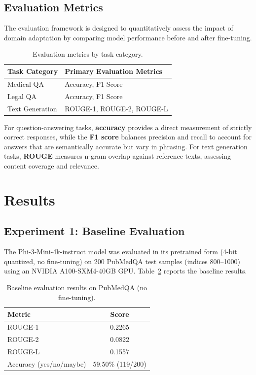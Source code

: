 \documentclass[12pt, letterpaper]{article}
\begin{document}
\subsection{Evaluation Metrics}

The evaluation framework is designed to quantitatively assess the impact of domain adaptation by comparing model performance before and after fine-tuning.

\begin{table}[H]
\centering
\caption{Evaluation metrics by task category.}
\label{tab:metrics}
\begin{tabular}{ll}
\toprule
\textbf{Task Category}       & \textbf{Primary Evaluation Metrics} \\
\midrule
Medical QA                   & Accuracy, F1 Score \\
Legal QA                     & Accuracy, F1 Score \\
Text Generation              & ROUGE-1, ROUGE-2, ROUGE-L \\
\bottomrule
\end{tabular}
\end{table}

For question-answering tasks, \textbf{accuracy} provides a direct measurement of strictly correct responses, while the \textbf{F1 score} balances precision and recall to account for answers that are semantically accurate but vary in phrasing. For text generation tasks, \textbf{ROUGE} \citep{lin2004rouge} measures n-gram overlap against reference texts, assessing content coverage and relevance.

\section{Results}
\label{sec:results}

\subsection{Experiment 1: Baseline Evaluation}

The Phi-3-Mini-4k-instruct model was evaluated in its pretrained form (4-bit quantized, no fine-tuning) on 200 PubMedQA test samples (indices 800--1000) using an NVIDIA A100-SXM4-40GB GPU. Table~\ref{tab:baseline-results} reports the baseline results.

\begin{table}[H]
\centering
\caption{Baseline evaluation results on PubMedQA (no fine-tuning).}
\label{tab:baseline-results}
\begin{tabular}{lc}
\toprule
\textbf{Metric}                      & \textbf{Score} \\
\midrule
ROUGE-1                              & 0.2265 \\
ROUGE-2                              & 0.0822 \\
ROUGE-L                              & 0.1557 \\
Accuracy (yes/no/maybe)              & 59.50\% (119/200) \\
\bottomrule
\end{tabular}
\end{table}
\end{document}
